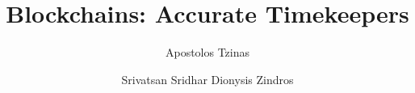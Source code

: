 \title{Blockchains: Accurate Timekeepers}
\ifanonymous{
  \author{}\institute{}
}
\else
\author{
        Apostolos Tzinas \and
        Srivatsan Sridhar 
        Dionysis Zindros \and
}
\fi
